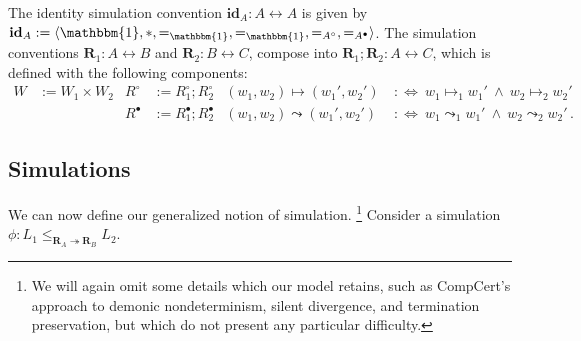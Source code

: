 \documentclass[acmsmall,screen,review,anonymous]{acmart}
\newcommand{\que}{\circ}
\newcommand{\ans}{\bullet}
\newcommand{\idsc}{\mathbf{id}} %
\begin{document}
\begin{definition} \label{def:sccomp}
The identity simulation convention
$\idsc_A : A \leftrightarrow A$
is given by
$\idsc_A := \langle
    \mathbbm{1}, *, {=}_\mathbbm{1}, {=}_\mathbbm{1}, {=}_{A^\que}, {=}_{A^\ans}
 \rangle$.
The simulation conventions
$\mathbf{R}_1 : A \leftrightarrow B$ and
$\mathbf{R}_2 : B \leftrightarrow C$,
compose into
$\mathbf{R}_1 \mathbin; \mathbf{R}_2 : A \leftrightarrow C$,
which is defined with the following components:
\begin{align*}
  W &:= W_1 \times W_2 &
  R^\que &:= R_1^\que \mathbin; R_2^\que &
  (w_1, w_2) \mapsto (w_1', w_2') \: &:\Leftrightarrow \:
    w_1 \mapsto_1 w_1' \: \wedge \:
    w_2 \mapsto_2 w_2' \\
&&  R^\ans &:= R_1^\ans \mathbin; R_2^\ans &
  (w_1, w_2) \leadsto (w_1', w_2') \: &:\Leftrightarrow \:
    w_1 \leadsto_1 w_1' \: \wedge \:
    w_2 \leadsto_2 w_2'
  \,.
\end{align*}
\end{definition}


\subsection{Simulations} \label{sec:base:sim} %

We can now define our generalized notion of simulation.%
\footnote{
  We will again omit some details
  which our model retains,
  such as CompCert's approach to
  demonic nondeterminism,
  silent divergence,
  and termination preservation,
  but which do not present any particular difficulty.
}
Consider a simulation
$
  \phi : L_1 \le_{\mathbf{R}_A \twoheadrightarrow \mathbf{R}_B} L_2
$.
\end{document}
